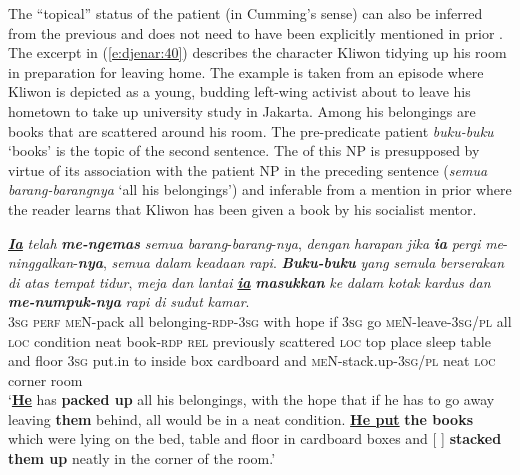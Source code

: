 \documentclass[output=paper
,modfonts
,nonflat]{langsci/langscibook}
\begin{document}
The “topical” status of the patient  (in Cumming’s sense) can also be inferred from the previous  and does not need to have been explicitly mentioned in prior . The excerpt in (\ref{e:djenar:40}) describes the character Kliwon tidying up his room in preparation for leaving home. The example is taken from an episode where Kliwon is depicted as a young, budding left-wing activist about to leave his hometown to take up university study in Jakarta. Among his belongings are books that are scattered around his room. The pre-predicate patient \textit{buku-buku} ‘books’ is the topic of the second sentence. The  of this NP is presupposed by virtue of its association with the patient NP in the preceding sentence (\textit{semua barang-barangnya} ‘all his belongings’) and inferable from a mention in prior  where the reader learns that Kliwon has been given a book by his socialist mentor.

\begin{exe}
	\ex\label{e:djenar:40}
	\gll \uline{\textbf{\textit{Ia}}} \textit{telah} \textbf{\textit{me-ngemas}} \textit{semua} \textit{barang}-\textit{barang}-\textit{nya}, \textit{dengan} \textit{harapan} \textit{jika} \textbf{\textit{ia}} \textit{pergi} \textit{me}-\textit{ninggalkan}-\textbf{\textit{nya}}, \textit{semua} \textit{dalam} \textit{keadaan} \textit{rapi}. \textbf{\textit{Buku-buku}} \textit{yang} \textit{semula} \textit{berserakan} \textit{di} \textit{atas} \textit{tempat} \textit{tidur}, \textit{meja} \textit{dan} \textit{lantai} \uline{\textbf{\textit{ia}}} \textbf{\textit{masukkan}} \textit{ke} \textit{dalam} \textit{kotak} \textit{kardus} \textit{dan} \textbf{\textit{me-numpuk-nya}} \textit{rapi} \textit{di} \textit{sudut} \textit{kamar}.\\
	\textsc{3sg} \textsc{perf} \textsc{meN}-pack all belonging-\textsc{rdp}-\textsc{3sg} with hope if \textsc{3sg} go \textsc{meN}-leave-\textsc{3sg/pl} all \textsc{loc} condition neat book-\textsc{rdp} \textsc{rel} previously scattered \textsc{loc} top place sleep table and floor \textsc{3sg} put.in to inside box cardboard and \textsc{meN}-stack.up-\textsc{3sg/pl} neat \textsc{loc} corner room\\
	\glt ‘\uline{\textbf{He}} has \textbf{packed up} all his belongings, with the hope that if he has to go away leaving \textbf{them} behind, all would be in a neat condition. \uline{\textbf{He put}} \textbf{the books} which were lying on the bed, table and floor in cardboard boxes and [ ] \textbf{stacked them up} neatly in the corner of the room.’ \citep[195--196]{Kurniawan2002}
\end{exe}
\end{document}
